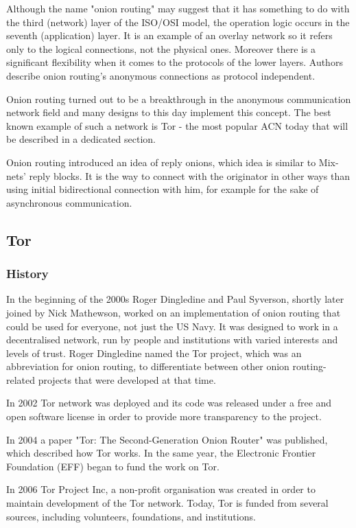 Although the name "onion routing" may suggest that it has something to do with the third (network) layer of the ISO/OSI model, the operation logic occurs in the seventh (application) layer. It is an example of an overlay network so it refers only to the logical connections, not the physical ones. Moreover there is a significant flexibility when it comes to the protocols of the lower layers. Authors describe onion routing’s anonymous connections as protocol independent.

Onion routing turned out to be a breakthrough in the anonymous communication network field and many designs to this day implement this concept. The best known example of such a network is Tor - the most popular ACN today that will be described in a dedicated section.

Onion routing introduced an idea of reply onions, which idea is similar to Mix-nets’ reply blocks. It is the way to connect with the originator in other ways than using initial bidirectional connection with him, for example for the sake of asynchronous communication.

\subsection{Tor}

\subsubsection{History}
In the beginning of the 2000s Roger Dingledine and Paul Syverson, shortly later joined by Nick Mathewson, worked on an implementation of onion routing that could be used for everyone, not just the US Navy. It was designed to work in a decentralised network, run by people and institutions with varied interests and levels of trust. Roger Dingledine named the Tor project, which was an abbreviation for onion routing, to differentiate between other onion routing-related projects that were developed at that time.

In 2002 Tor network was deployed and its code was released under a free and open software license in order to provide more transparency to the project.

In 2004 a paper "Tor: The Second-Generation Onion Router" \cite{tor-design} was published, which described how Tor works. In the same year, the Electronic Frontier Foundation (EFF) began to fund the work on Tor.

In 2006 Tor Project Inc, a non-profit organisation was created in order to maintain development of the Tor network. Today, Tor is funded from several sources, including volunteers, foundations, and institutions.


